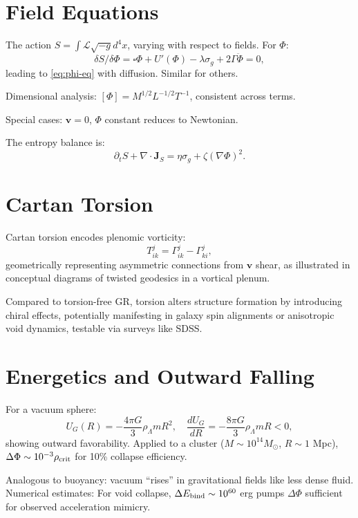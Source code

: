\documentclass[11pt]{article}
\theoremstyle{plain}
\theoremstyle{definition}
\begin{document}
\section{Field Equations}
The action $S = \int \mathcal{L} \sqrt{-g} d^4x$, varying with respect to fields. For $\Phi$:
\[
\delta S / \delta \Phi = \square \Phi + U'(\Phi) - \lambda \sigma_g + 2\Gamma \ddot{\Phi} = 0,
\]
leading to \eqref{eq:phi-eq} with diffusion. Similar for others.

Dimensional analysis: $[\Phi] = M^{1/2} L^{-1/2} T^{-1}$, consistent across terms.

Special cases: $\bm{v} = 0$, $\Phi$ constant reduces to Newtonian.

The entropy balance is:
\begin{equation}
\partial_t S + \nabla \cdot \bm{J}_S = \eta \sigma_g + \zeta (\nabla \Phi)^2.
\end{equation}

\section{Cartan Torsion}
Cartan torsion encodes plenomic vorticity:
\begin{equation}
T^j_{ik} = \Gamma^j_{ik} - \Gamma^j_{ki},
\end{equation}
geometrically representing asymmetric connections from $\bm{v}$ shear, as illustrated in conceptual diagrams of twisted geodesics in a vortical plenum.

Compared to torsion-free GR, torsion alters structure formation by introducing chiral effects, potentially manifesting in galaxy spin alignments or anisotropic void dynamics, testable via surveys like SDSS.

\section{Energetics and Outward Falling}
For a vacuum sphere:
\begin{equation}
U_G(R) = -\frac{4\pi G}{3} \rho_\Lambda m R^2, \quad \frac{dU_G}{dR} = -\frac{8\pi G}{3} \rho_\Lambda m R < 0,
\end{equation}
showing outward favorability. Applied to a cluster ($M \sim 10^{14} M_\odot$, $R \sim 1$ Mpc), $\Delta \Phi \sim 10^{-3} \rho_{\rm crit}$ for 10\% collapse efficiency.

Analogous to buoyancy: vacuum ``rises'' in gravitational fields like less dense fluid. Numerical estimates: For void collapse, $\Delta E_{\rm bind} \sim 10^{60}$ erg pumps $\Delta \Phi$ sufficient for observed acceleration mimicry.
\end{document}
